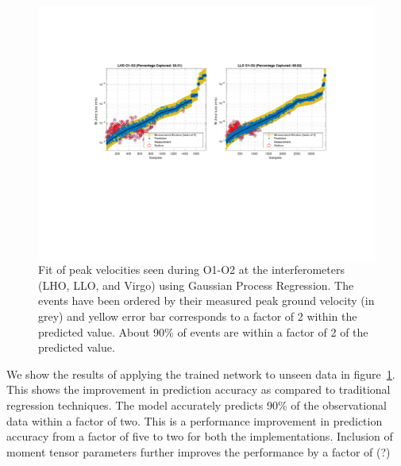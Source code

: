 \documentclass[preprint, aps, showpacs]{revtex4-1}
\newcommand{\rednote}[1]{{\color{red} (#1)}}
\begin{document}
\begin{figure}[!htb]
\hspace*{-0.5cm}
 \includegraphics[width=\textwidth]{./plots/GPR_Matlab_O1O2.pdf}
 \caption{Fit of peak velocities seen during O1-O2 at the interferometers (LHO, LLO, and Virgo) using Gaussian Process Regression. The events have been ordered by their measured peak ground velocity (in grey) and yellow error bar corresponds to a factor of 2 within the predicted value. About 90\% of events are within a factor of 2 of the predicted value.}
 \label{fig:regression}
\end{figure}

We show the results of applying the trained network to unseen data in figure~\ref{fig:regression}.
This shows the improvement in prediction accuracy as compared to traditional regression techniques.  The model accurately predicts  90\% of the observational data within a factor of two.
This is a performance improvement in prediction accuracy from a factor of five to two for both the implementations. 
Inclusion of moment tensor parameters further improves the performance by a factor of \rednote{?}
\end{document}
